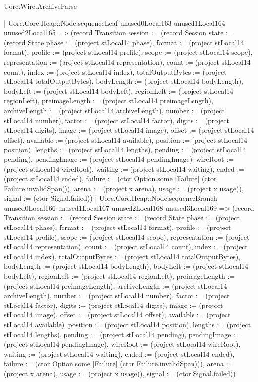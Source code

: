 \begin{lexlean}{Uorc.Wire.ArchiveParse}
\begin{semanticmodule}
{            | Uorc.Core.Heap::Node.sequenceLeaf unused0Local163 unused1Local164 unused2Local165 => (record Transition {session := (record Session {state := (record State {phase := (project stLocal14 phase), format := (project stLocal14 format), profile := (project stLocal14 profile), scope := (project stLocal14 scope), representation := (project stLocal14 representation), count := (project stLocal14 count), index := (project stLocal14 index), totalOutputBytes := (project stLocal14 totalOutputBytes), bodyLength := (project stLocal14 bodyLength), bodyLeft := (project stLocal14 bodyLeft), regionLeft := (project stLocal14 regionLeft), preimageLength := (project stLocal14 preimageLength), archiveLength := (project stLocal14 archiveLength), number := (project stLocal14 number), factor := (project stLocal14 factor), digits := (project stLocal14 digits), image := (project stLocal14 image), offset := (project stLocal14 offset), available := (project stLocal14 available), position := (project stLocal14 position), lengths := (project stLocal14 lengths), pending := (project stLocal14 pending), pendingImage := (project stLocal14 pendingImage), wireRoot := (project stLocal14 wireRoot), waiting := (project stLocal14 waiting), ended := (project stLocal14 ended), failure := (ctor Option.some [Failure] (ctor Failure.invalidSpan))}), arena := (project x arena), usage := (project x usage)}), signal := (ctor Signal.failed)})
            | Uorc.Core.Heap::Node.sequenceBranch unused0Local166 unused1Local167 unused2Local168 unused3Local169 => (record Transition {session := (record Session {state := (record State {phase := (project stLocal14 phase), format := (project stLocal14 format), profile := (project stLocal14 profile), scope := (project stLocal14 scope), representation := (project stLocal14 representation), count := (project stLocal14 count), index := (project stLocal14 index), totalOutputBytes := (project stLocal14 totalOutputBytes), bodyLength := (project stLocal14 bodyLength), bodyLeft := (project stLocal14 bodyLeft), regionLeft := (project stLocal14 regionLeft), preimageLength := (project stLocal14 preimageLength), archiveLength := (project stLocal14 archiveLength), number := (project stLocal14 number), factor := (project stLocal14 factor), digits := (project stLocal14 digits), image := (project stLocal14 image), offset := (project stLocal14 offset), available := (project stLocal14 available), position := (project stLocal14 position), lengths := (project stLocal14 lengths), pending := (project stLocal14 pending), pendingImage := (project stLocal14 pendingImage), wireRoot := (project stLocal14 wireRoot), waiting := (project stLocal14 waiting), ended := (project stLocal14 ended), failure := (ctor Option.some [Failure] (ctor Failure.invalidSpan))}), arena := (project x arena), usage := (project x usage)}), signal := (ctor Signal.failed)})
}
\end{semanticmodule}
\end{lexlean}

